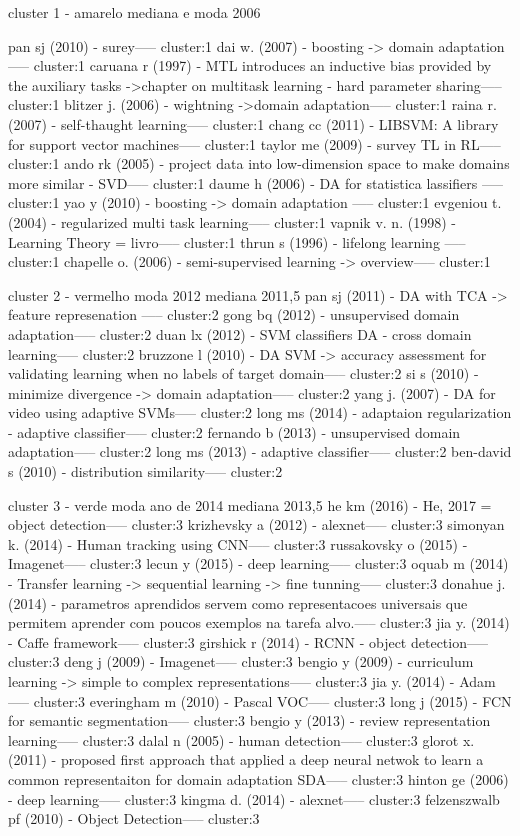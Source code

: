 \documentclass[sigconf]{acmart}
\begin{document}
  cluster 1 - amarelo
  mediana e moda 2006

  pan sj (2010) - surey----- cluster:1
dai w. (2007) - boosting -> domain adaptation ----- cluster:1
caruana r (1997) - MTL introduces an inductive bias provided by the auxiliary tasks ->chapter on multitask learning - hard parameter sharing----- cluster:1
blitzer j. (2006) - wightning ->domain adaptation----- cluster:1
raina r. (2007) - self-thaught learning----- cluster:1
chang cc (2011) - LIBSVM: A library for support vector machines----- cluster:1
taylor me (2009) - survey TL in RL----- cluster:1
ando rk (2005) - project data into low-dimension space to make domains more similar - SVD----- cluster:1
daume h (2006) - DA for statistica lassifiers ----- cluster:1
yao y (2010) - boosting -> domain adaptation ----- cluster:1
evgeniou t. (2004) - regularized multi task learning----- cluster:1
vapnik v. n. (1998) - Learning Theory = livro----- cluster:1
thrun s (1996) - lifelong learning ----- cluster:1
chapelle o. (2006) - semi-supervised learning -> overview----- cluster:1

  cluster 2 - vermelho
  moda 2012
  mediana 2011,5
  pan sj (2011) - DA with TCA -> feature represenation ----- cluster:2
gong bq (2012) - unsupervised domain adaptation----- cluster:2
duan lx (2012) - SVM classifiers DA - cross domain learning----- cluster:2
bruzzone l (2010) - DA SVM -> accuracy assessment for validating learning when no labels of target domain----- cluster:2
si s (2010) - minimize divergence -> domain adaptation----- cluster:2
yang j. (2007) - DA for video using adaptive SVMs----- cluster:2
long ms (2014) - adaptaion regularization - adaptive classifier----- cluster:2
fernando b (2013) - unsupervised domain adaptation----- cluster:2
long ms (2013) - adaptive classifier----- cluster:2
ben-david s (2010) - distribution similarity----- cluster:2

cluster 3 - verde
  moda ano de 2014
  mediana 2013,5
  he km (2016) - He, 2017 = object detection----- cluster:3
  krizhevsky a (2012) - alexnet----- cluster:3
  simonyan k. (2014) - Human tracking using CNN----- cluster:3
  russakovsky o (2015) - Imagenet----- cluster:3
  lecun y (2015) - deep learning----- cluster:3
  oquab m (2014) - Transfer learning -> sequential learning -> fine tunning----- cluster:3
  donahue j. (2014) - parametros aprendidos servem como representacoes universais que permitem aprender com poucos exemplos na tarefa alvo.----- cluster:3
  jia y. (2014) - Caffe framework----- cluster:3
  girshick r (2014) - RCNN - object detection----- cluster:3
  deng j (2009) - Imagenet----- cluster:3
  bengio y (2009) - curriculum learning -> simple to complex representations----- cluster:3
  jia y. (2014) - Adam----- cluster:3
  everingham m (2010) - Pascal VOC----- cluster:3
  long j (2015) - FCN for semantic segmentation----- cluster:3
  bengio y (2013) - review representation learning----- cluster:3
  dalal n (2005) - human detection----- cluster:3
  glorot x. (2011) - proposed first approach that applied a deep neural netwok to learn a common representaiton for domain adaptation  SDA----- cluster:3
  hinton ge (2006) - deep learning----- cluster:3
  kingma d. (2014) - alexnet----- cluster:3
  felzenszwalb pf (2010) - Object Detection----- cluster:3
\end{document}
